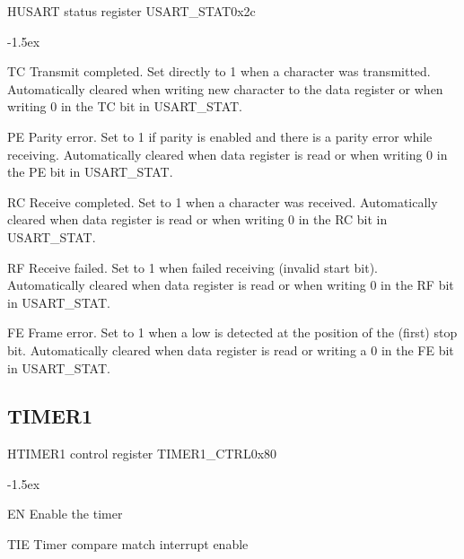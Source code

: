 \documentclass[12pt]{article}
\begin{document}
\begin{register}{H}{USART status register USART\_STAT}{0x2c}
\label{usartstat}
%
%
%
%
%
%
\regnewline%
\end{register}
\begin{regdesc}[0.8\textwidth]\begin{reglist}[0000]
\itemsep-1.5ex
\item[TC] Transmit completed. Set directly to 1 when a character was transmitted. Automatically cleared when writing new character to the data register or when writing 0 in the TC bit in \mbox{USART\_STAT}.
\item[PE] Parity error. Set to 1 if parity is enabled and there is a parity error while receiving. Automatically cleared when data register is read or when writing 0 in the PE bit in USART\_STAT.
\item[RC] Receive completed. Set to 1 when a character was received. Automatically cleared when data register is read or when writing 0 in the RC bit in USART\_STAT.
\item[RF] Receive failed. Set to 1 when failed receiving (invalid start bit). Automatically cleared when data register is read or when writing 0 in the RF bit in USART\_STAT.
\item [FE] Frame error. Set to 1 when a low is detected at the position of the (first) stop bit. Automatically cleared when data register is read or writing a 0 in the FE bit in USART\_STAT.
\end{reglist}\end{regdesc}

\subsection{TIMER1}
\begin{register}{H}{TIMER1 control register TIMER1\_CTRL}{0x80}
\label{timer1ctrl}
%
%
%
%
\regnewline%
\end{register}
\begin{regdesc}[0.8\textwidth]\begin{reglist}[0000]
\itemsep-1.5ex
\item[EN] Enable the timer
\item[TIE] Timer compare match interrupt enable
\end{reglist}\end{regdesc}
\end{document}
